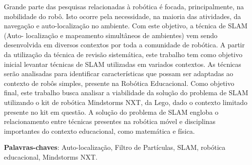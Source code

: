\begin{resumo}

 	Grande parte das pesquisas relacionadas à robótica é focada, principalmente, na mobilidade do robô. Isto ocorre pela necessidade, na maioria das atividades, da
navegação e auto-localização no ambiente. Com este objetivo, a técnica de SLAM (Auto-
localização e mapeamento simultâneos de ambientes) vem sendo desenvolvida em diversos
contextos por toda a comunidade de robótica. A partir da utilização da técnica
de revisão sistemática, este trabalho tem como objetivo inicial levantar técnicas
de SLAM utilizadas em variados contextos. As técnicas serão analisadas para identificar características que possam ser adaptadas ao contexto de robôs simples, presente na Robótica Educacional.
Como objetivo final, este trabalho busca analisar a viabilidade da solução do problema de SLAM utilizando o kit de robótica Mindstorms NXT, da Lego, dado o contexto limitado
presente no kit em questão.
A solução do problema de SLAM engloba o relacionamento entre técnicas presentes na robótica móvel e disciplinas importantes do contexto educacional, como matemática e física.

 \vspace{\onelineskip}

 \noindent
 \textbf{Palavras-chaves}: Auto-localização, Filtro de Partículas, SLAM, robótica educacional, Mindstorms NXT.
\end{resumo}
